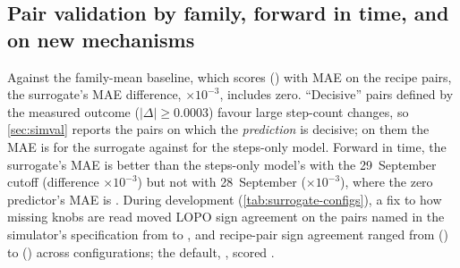 \begin{table}[!htbp]
  \centering
  \caption{\textbf{The  knob coefficients furthest from zero} in posterior-SD units, in $10^{-3}$ bpb
    per scaled unit. ``Runs $\neq0$'' counts fitted runs in which the feature is non-zero, and ``Code eras'' the eras
    those runs come from. Knob names omit the \texttt{FF\_} prefix.}
  \label{tab:coefficients}
  
\end{table}

\subsection{Pair validation by family, forward in time, and on new mechanisms}
\label{app:pairval}

Against the family-mean baseline, which scores  () with MAE
 on the recipe pairs, the surrogate's MAE difference, $\times10^{-3}$,
includes zero. ``Decisive'' pairs defined by the measured outcome ($|\Delta|\ge0.0003$) favour large step-count changes, so
\cref{sec:simval} reports the pairs on which the \emph{prediction} is decisive; on them the MAE is
 for the surrogate against  for the steps-only model. Forward in
time, the surrogate's MAE is better than the steps-only model's with the 29~September cutoff (difference
$\times10^{-3}$) but not with 28~September ($\times10^{-3}$), where the zero
predictor's MAE is . During development (\cref{tab:surrogate-configs}), a fix to how missing
knobs are read moved LOPO sign agreement on the pairs named in the simulator's specification from
\docnum{} to \docnum{}, and recipe-pair sign agreement ranged from
\docnum{} () to \docnum{} () across
configurations; the default, , scored \docnum{}.

\begin{table}[!htbp]
  \centering
  \caption{\textbf{Leave one pair out (LOPO) and leave one knob value out (LOKVO) by pair family}, in $10^{-3}$ bpb.
    The ``seed'' and ``chip'' families compare identical recipes and measure noise; ``cold upload rehearsals'' pairs
    compare upload rehearsals.}
  \label{tab:lopo-family}
  
\end{table}

